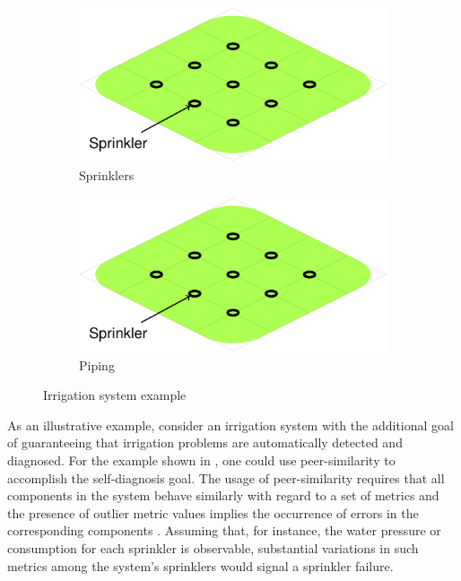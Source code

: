 \begin{figure}[ht]
  \begin{subfigure}{\columnwidth}
    \includegraphics[page=1]{figures/introduction/figures/main.pdf}
    \caption{Sprinklers\label{fig:intro:irrigation-example-sprinklers}}
  \end{subfigure}


  \begin{subfigure}{\columnwidth}
    \includegraphics[page=2]{figures/introduction/figures/main.pdf}
    \caption{Piping\label{fig:intro:irrigation-example-piping}}
  \end{subfigure}
  \caption{Irrigation system example\label{fig:intro:irrigation-example}}
\end{figure}

As an illustrative example, consider an irrigation system with the
additional goal of guaranteeing that irrigation problems are
automatically detected and diagnosed.
%
For the example shown in
, one could use
peer-similarity to accomplish the self-diagnosis goal.
%
The usage of peer-similarity requires that all
components in the system behave similarly with regard to a set of
metrics and the presence of outlier metric values implies the
occurrence of errors in the corresponding components
\cite{Kasick10,Shvachko10,Tan10}.
%
Assuming that, for instance, the water pressure or consumption for
each sprinkler is observable, substantial variations in such metrics
among the system's sprinklers would signal a sprinkler failure.


